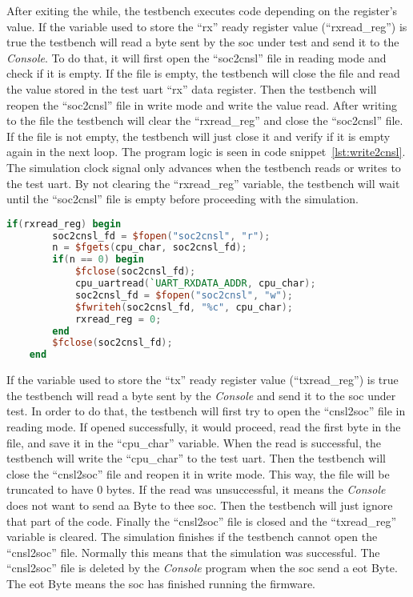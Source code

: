 After exiting the while, the testbench executes code depending on the register's value. If the variable used to store the \enquote{rx} ready register value (\enquote{rxread\_reg}) is true the testbench will read a byte sent by the \acrshort{soc} under test and send it to the \textit{Console}. To do that, it will first open the \enquote{soc2cnsl} file in reading mode and check if it is empty. If the file is empty, the testbench will close the file and read the value stored in the test \acrshort{uart} \enquote{rx} data register. Then the testbench will reopen the \enquote{soc2cnsl} file in write mode and write the value read. After writing to the file the testbench will clear the \enquote{rxread\_reg} and close the \enquote{soc2cnsl} file. If the file is not empty, the testbench will just close it and verify if it is empty again in the next loop. The program logic is seen in code snippet~\ref{lst:write2cnsl}. The simulation clock signal only advances when the testbench reads or writes to the test \acrshort{uart}. By not clearing the \enquote{rxread\_reg} variable, the testbench will wait until the \enquote{soc2cnsl} file is empty before proceeding with the simulation.

\begin{lstlisting}[language=Verilog, caption={Write byte from \acrshort{soc} to \textit{Console}.}, label=lst:write2cnsl]
    if(rxread_reg) begin
        soc2cnsl_fd = $fopen("soc2cnsl", "r");
        n = $fgets(cpu_char, soc2cnsl_fd);
        if(n == 0) begin
            $fclose(soc2cnsl_fd);
            cpu_uartread(`UART_RXDATA_ADDR, cpu_char);
            soc2cnsl_fd = $fopen("soc2cnsl", "w");
            $fwriteh(soc2cnsl_fd, "%c", cpu_char);
            rxread_reg = 0;
        end
        $fclose(soc2cnsl_fd);
    end
\end{lstlisting}

If the variable used to store the \enquote{tx} ready register value (\enquote{txread\_reg}) is true the testbench will read a byte sent by the \textit{Console} and send it to the \acrshort{soc} under test. In order to do that, the testbench will first try to open the \enquote{cnsl2soc} file in reading mode. If opened successfully, it would proceed, read the first byte in the file, and save it in the \enquote{cpu\_char} variable. When the read is successful, the testbench will write the \enquote{cpu\_char} to the test \acrshort{uart}. Then the testbench will close the \enquote{cnsl2soc} file and reopen it in write mode. This way, the file will be truncated to have 0 bytes. If the read was unsuccessful, it means the \textit{Console} does not want to send aa Byte to thee \acrshort{soc}. Then the testbench will just ignore that part of the code. Finally the \enquote{cnsl2soc} file is closed and the \enquote{txread\_reg} variable is cleared. The simulation finishes if the testbench cannot open the \enquote{cnsl2soc} file. Normally this means that the simulation was successful. The \enquote{cnsl2soc} file is deleted by the \textit{Console} program when the \acrshort{soc} send a \acrfull{eot} Byte. The \acrshort{eot} Byte means the \acrshort{soc} has finished running the firmware.

